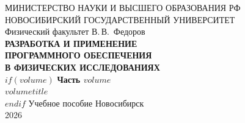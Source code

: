 \documentclass[12pt,oneside]{book}
\begin{document}
\thispagestyle{empty}
\begin{center}
  \setlength{\parindent}{0pt}
  {\small МИНИСТЕРСТВО НАУКИ И ВЫСШЕГО ОБРАЗОВАНИЯ РФ}\\[2pt]
  {\small НОВОСИБИРСКИЙ ГОСУДАРСТВЕННЫЙ УНИВЕРСИТЕТ}\\[2pt]
  {\small Физический факультет}
  \vfill
  {\large В.\,В.~Федоров}\\[16mm]
  {\LARGE\bfseries РАЗРАБОТКА И ПРИМЕНЕНИЕ}\\[4pt]
  {\LARGE\bfseries ПРОГРАММНОГО ОБЕСПЕЧЕНИЯ}\\[4pt]
  {\LARGE\bfseries В ФИЗИЧЕСКИХ ИССЛЕДОВАНИЯХ}\\[8mm]
$if(volume)$
  {\Large\bfseries Часть $volume$}\\[3pt]
  {\large\itshape $volumetitle$}\\[8mm]
$endif$
  {\large Учебное пособие}
  \vfill
  {\small Новосибирск}\\
  {\small 2026}
\end{center}
\clearpage
\end{document}
